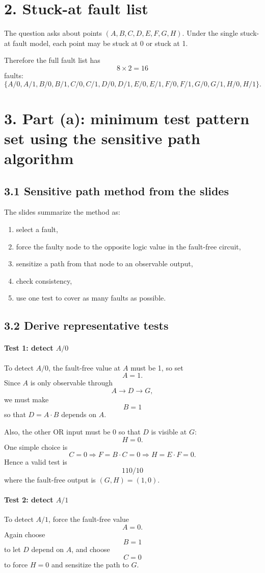 \documentclass[11pt,a4paper]{article}
\begin{document}
\section*{2. Stuck-at fault list}
The question asks about points $(A,B,C,D,E,F,G,H)$. Under the single stuck-at fault model, each point may be stuck at 0 or stuck at 1.

Therefore the full fault list has
\[
8 \times 2 = 16
\]
faults:
\[
\{A/0,A/1,B/0,B/1,C/0,C/1,D/0,D/1,E/0,E/1,F/0,F/1,G/0,G/1,H/0,H/1\}.
\]

\section*{3. Part (a): minimum test pattern set using the sensitive path algorithm}
\subsection*{3.1 Sensitive path method from the slides}
The slides summarize the method as:
\begin{enumerate}
  \item select a fault,
  \item force the faulty node to the opposite logic value in the fault-free circuit,
  \item sensitize a path from that node to an observable output,
  \item check consistency,
  \item use one test to cover as many faults as possible.
\end{enumerate}

\subsection*{3.2 Derive representative tests}
\paragraph{Test 1: detect $A/0$}
To detect $A/0$, the fault-free value at $A$ must be 1, so set
\[
A=1.
\]
Since $A$ is only observable through
\[
A \rightarrow D \rightarrow G,
\]
we must make
\[
B=1
\]
so that $D=A\cdot B$ depends on $A$.

Also, the other OR input must be 0 so that $D$ is visible at $G$:
\[
H=0.
\]
One simple choice is
\[
C=0 \Rightarrow F=B\cdot C=0 \Rightarrow H=E\cdot F=0.
\]
Hence a valid test is
\[
\boxed{110/10}
\]
where the fault-free output is $(G,H)=(1,0)$.

\paragraph{Test 2: detect $A/1$}
To detect $A/1$, force the fault-free value
\[
A=0.
\]
Again choose
\[
B=1
\]
to let $D$ depend on $A$, and choose
\[
C=0
\]
to force $H=0$ and sensitize the path to $G$.
\end{document}
